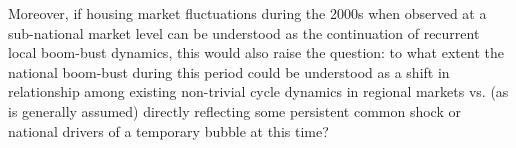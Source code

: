 \documentclass[11pt]{article}
\begin{document}

Moreover, if housing market fluctuations during the 2000s when observed at a sub-national market level can be understood as the continuation of recurrent local boom-bust dynamics, this would also raise the question: to what extent the national boom-bust during this period could be understood as a shift in relationship among existing non-trivial cycle dynamics in regional markets vs. (as is generally assumed) directly reflecting some persistent common shock or national drivers of a temporary bubble at this time? %

\end{document}
